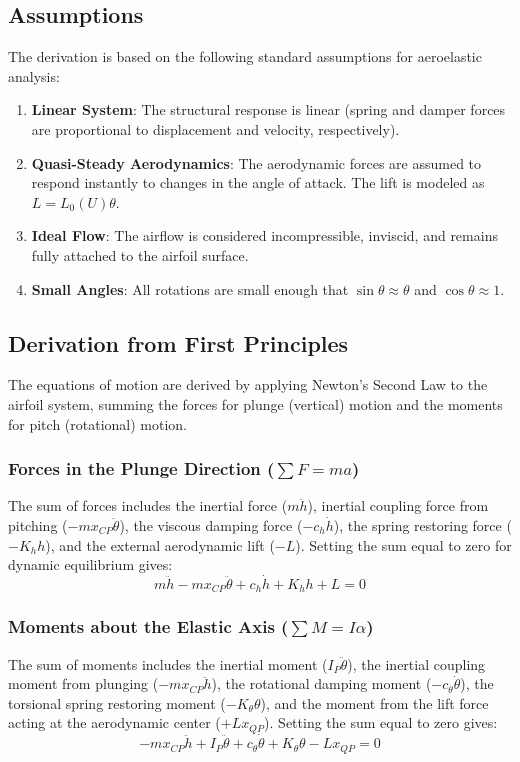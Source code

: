 \documentclass{article}
\begin{document}
\subsection{Assumptions}
The derivation is based on the following standard assumptions for aeroelastic analysis:

\begin{enumerate}
    \item \textbf{Linear System}: The structural response is linear (spring and damper forces are proportional to displacement and velocity, respectively).
    \item \textbf{Quasi-Steady Aerodynamics}: The aerodynamic forces are assumed to respond instantly to changes in the angle of attack. The lift is modeled as $L = L_0(U)\theta$.
    \item \textbf{Ideal Flow}: The airflow is considered incompressible, inviscid, and remains fully attached to the airfoil surface.
    \item \textbf{Small Angles}: All rotations are small enough that $\sin\theta \approx \theta$ and $\cos\theta \approx 1$.
\end{enumerate}

\subsection{Derivation from First Principles}
The equations of motion are derived by applying Newton's Second Law to the airfoil system, summing the forces for plunge (vertical) motion and the moments for pitch (rotational) motion.

\subsubsection{Forces in the Plunge Direction ($\sum F = ma$)}
The sum of forces includes the inertial force ($m\ddot{h}$), inertial coupling force from pitching ($-mx_{CP}\ddot{\theta}$), the viscous damping force ($-c_h\dot{h}$), the spring restoring force ($-K_h h$), and the external aerodynamic lift ($-L$). Setting the sum equal to zero for dynamic equilibrium gives:
\begin{equation}
m\ddot{h} - mx_{CP}\ddot{\theta} + c_h\dot{h} + K_h h + L = 0
\label{eq:d1_phys_plunge}
\end{equation}

\subsubsection{Moments about the Elastic Axis ($\sum M = I\alpha$)}
The sum of moments includes the inertial moment ($I_P\ddot{\theta}$), the inertial coupling moment from plunging ($-mx_{CP}\ddot{h}$), the rotational damping moment ($-c_\theta\dot{\theta}$), the torsional spring restoring moment ($-K_\theta\theta$), and the moment from the lift force acting at the aerodynamic center ($+Lx_{QP}$). Setting the sum equal to zero gives:
\begin{equation}
-mx_{CP}\ddot{h} + I_P\ddot{\theta} + c_\theta\dot{\theta} + K_\theta\theta - Lx_{QP} = 0
\label{eq:d1_phys_pitch}
\end{equation}
\end{document}
